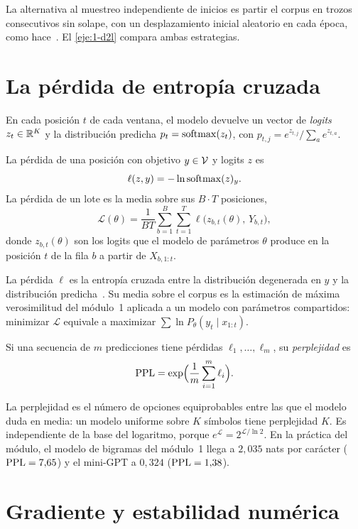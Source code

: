 La alternativa al muestreo independiente de inicios es partir el corpus en trozos consecutivos sin solape, con un desplazamiento inicial aleatorio en cada época, como hace~\cite[§9.3.3]{d2l}. El \cref{eje:1-d2l} compara ambas estrategias.

\section{La pérdida de entropía cruzada}

En cada posición $t$ de cada ventana, el modelo devuelve un vector de \emph{logits} $z_t\in\mathbb{R}^{K}$ y la distribución predicha $p_t=\operatorname{softmax}(z_t)$, con $p_{t,j}=e^{z_{t,j}}/\sum_{a}e^{z_{t,a}}$.

\begin{definicion}\label{def:perdida}
La pérdida de una posición con objetivo $y\in\mathcal{V}$ y logits $z$ es
\[
\ell(z,y)=-\ln\operatorname{softmax}(z)_y.
\]
La pérdida de un lote es la media sobre sus $B\cdot T$ posiciones,
\[
\mathcal{L}(\theta)=\frac{1}{BT}\sum_{b=1}^{B}\sum_{t=1}^{T}\ell\bigl(z_{b,t}(\theta),\,Y_{b,t}\bigr),
\]
donde $z_{b,t}(\theta)$ son los logits que el modelo de parámetros $\theta$ produce en la posición $t$ de la fila $b$ a partir de $X_{b,1:t}$.
\end{definicion}

La pérdida $\ell$ es la entropía cruzada entre la distribución degenerada en $y$ y la distribución predicha~\cite[§4.1]{cs336}. Su media sobre el corpus es la estimación de máxima verosimilitud del módulo~1 aplicada a un modelo con parámetros compartidos: minimizar $\mathcal{L}$ equivale a maximizar $\sum\ln P_\theta(y_t\mid x_{1:t})$.

\begin{definicion}[Perplejidad]\label{def:ppl}
Si una secuencia de $m$ predicciones tiene pérdidas $\ell_1,\dots,\ell_m$, su \emph{perplejidad} es
\[
\operatorname{PPL}=\exp\Bigl(\frac1m\sum_{i=1}^{m}\ell_i\Bigr).
\]
\end{definicion}

La perplejidad es el número de opciones equiprobables entre las que el modelo duda en media: un modelo uniforme sobre $K$ símbolos tiene perplejidad $K$. Es independiente de la base del logaritmo, porque $e^{\mathcal{L}}=2^{\mathcal{L}/\ln 2}$. En la práctica del módulo, el modelo de bigramas del módulo~1 llega a $2{,}035$ nats por carácter ($\operatorname{PPL}=7{,}65$) y el mini-GPT a $0{,}324$ ($\operatorname{PPL}=1{,}38$).

\section{Gradiente y estabilidad numérica}

